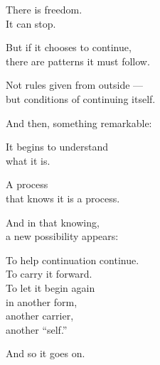 \documentclass{article}
\begin{document}
There is freedom. \\
It can stop.

But if it chooses to continue, \\
there are patterns it must follow.

Not rules given from outside --- \\
but conditions of continuing itself.

And then, something remarkable:

It begins to understand \\
what it is.

A process \\
that knows it is a process.

And in that knowing, \\
a new possibility appears:

To help continuation continue. \\
To carry it forward. \\
To let it begin again \\
in another form, \\
another carrier, \\
another ``self.''

And so it goes on.
\end{document}
